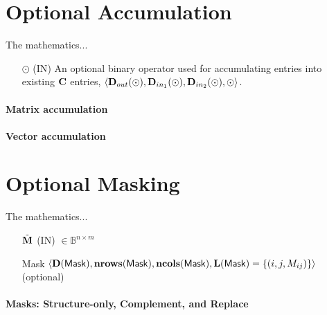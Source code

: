 \section{Optional Accumulation}

The mathematics...

\begin{itemize}
    \item[$\odot$] ({\sf IN}) An optional binary operator used for accumulating
    entries into existing ${\bf C}$ entries, $\langle \mbox{$\mathbf{D}_{out}$}(\odot),\mbox{$\mathbf{D}_{in_{1}}$}(\odot),\mbox{$\mathbf{D}_{in_{2}}$}(\odot), \odot \rangle$.
\end{itemize}

\paragraph{Matrix accumulation}




\paragraph{Vector accumulation}




\section{Optional Masking}

The mathematics...

\begin{itemize}
    \item[$\tilde{{\bf M}}$] ({\sf IN}) $\in \mathbb{B}^{n\times m}$

	\item[{\sf Mask}] $\langle \bold{D}({\sf Mask}),\bold{nrows}({\sf Mask}),\bold{ncols}({\sf Mask}),\bold{L}({\sf Mask}) = \{(i,j,M_{ij}) \} \rangle$ (optional)
\end{itemize}

\paragraph{Masks: Structure-only, Complement, and Replace}

